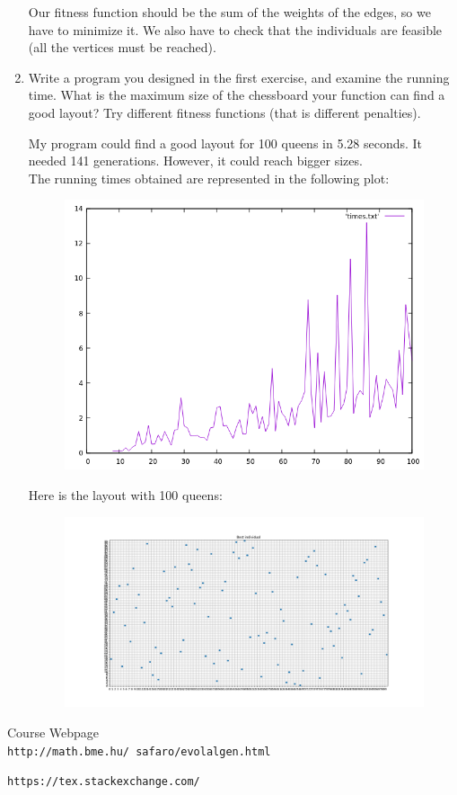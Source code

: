 \documentclass[12pt,english]{article}
\newenvironment{statement}{\fontfamily{ptm}\selectfont}{\par}
\begin{document}
\begin{enumerate}
		Our fitness function should be the sum of the weights of the edges, so we have to minimize it. We also have to check that the individuals are feasible (all the vertices must be reached).


	\item
		\begin{statement}
		Write a program you designed in the first exercise, and examine the running time. What is the maximum size of the chessboard your function can find a good layout? Try different fitness functions (that is different penalties).
		\end{statement}
		My program could find a good layout for 100 queens in 5.28 seconds. It needed 141 generations. However, it could reach bigger sizes.\\
		The running times obtained are represented in the following plot:
		\begin{figure}[H]
			\centering
			\includegraphics[scale=0.5]{img/plot}
		\end{figure}

		Here is the layout with 100 queens:
		\begin{figure}[H]
			\centering
			\includegraphics[scale=0.25]{img/100queens}
		\end{figure}


\end{enumerate}


\begin{thebibliography}{9}

Course Webpage
\\\texttt{http://math.bme.hu/~safaro/evolalgen.html}


\texttt{https://tex.stackexchange.com/}


\end{thebibliography}
\end{document}
